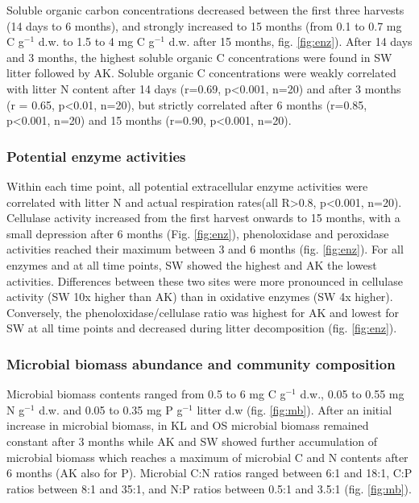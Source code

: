 Soluble organic carbon concentrations decreased between the first three harvests (14 days to 6 months), and strongly increased to 15 months (from 0.1 to 0.7 mg C g$^{-1}$  d.w. to 1.5 to 4 mg C g$^{-1}$ d.w. after 15 months, fig. \ref{fig:enz}). After 14 days and 3 months, the highest soluble organic C concentrations were found in SW litter followed by AK. Soluble organic C concentrations were weakly correlated with litter N content after 14 days (r=0.69, p\textless 0.001, n=20) and after 3 months (r = 0.65, p\textless 0.01, n=20), but strictly correlated after 6 months (r=0.85, p\textless 0.001, n=20) and 15 months (r=0.90, p\textless 0.001, n=20).

\subsubsection*{Potential enzyme activities}
Within each time point, all potential extracellular enzyme activities were correlated with litter N and actual respiration rates(all R\textgreater 0.8, p\textless 0.001, n=20). Cellulase activity increased from the first harvest onwards to 15 months, with a small depression after 6 months (Fig. \ref{fig:enz}), phenoloxidase and peroxidase activities reached their maximum between 3 and 6 months (fig. \ref{fig:enz}). For all enzymes and at all time points, SW showed the highest and AK the lowest activities. Differences between these two sites were more pronounced in cellulase activity (SW 10x higher than AK) than in oxidative enzymes (SW 4x higher). Conversely, the phenoloxidase/cellulase ratio was highest for AK and lowest for SW at all time points and decreased during litter decomposition (fig. \ref{fig:enz}).

\subsubsection*{Microbial biomass abundance and community composition}
Microbial biomass contents ranged from 0.5 to 6 mg C g$^{-1}$ d.w., 0.05 to 0.55 mg N g$^{-1}$ d.w. and 0.05 to 0.35 mg P g$^{-1}$ litter d.w (fig. \ref{fig:mb}). After an initial increase in microbial biomass, in KL and OS microbial biomass remained constant after 3 months while AK and SW showed further accumulation of microbial biomass which reaches a maximum of microbial C and N contents after 6 months (AK also for P). Microbial C:N ratios ranged between 6:1 and 18:1, C:P ratios between 8:1 and 35:1, and N:P ratios between 0.5:1 and 3.5:1 (fig. \ref{fig:mb}).

